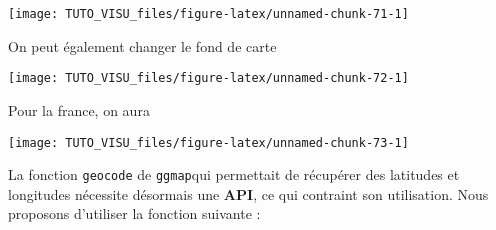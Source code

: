 \documentclass[]{book}
\newenvironment{Shaded}{\begin{snugshade}}{\end{snugshade}}
\newcommand{\DataTypeTok}[1]{\textcolor[rgb]{0.13,0.29,0.53}{#1}}
\newcommand{\DecValTok}[1]{\textcolor[rgb]{0.00,0.00,0.81}{#1}}
\newcommand{\KeywordTok}[1]{\textcolor[rgb]{0.13,0.29,0.53}{\textbf{#1}}}
\newcommand{\NormalTok}[1]{#1}
\newcommand{\OperatorTok}[1]{\textcolor[rgb]{0.81,0.36,0.00}{\textbf{#1}}}
\newcommand{\StringTok}[1]{\textcolor[rgb]{0.31,0.60,0.02}{#1}}
\theoremstyle{definition}
\theoremstyle{definition}
\theoremstyle{definition}
\theoremstyle{remark}
\begin{document}
\begin{center}\texttt{[image: TUTO\_VISU\_files/figure-latex/unnamed-chunk-71-1]} \end{center}

On peut également changer le fond de carte

\begin{Shaded}
\end{Shaded}

\begin{center}\texttt{[image: TUTO\_VISU\_files/figure-latex/unnamed-chunk-72-1]} \end{center}

Pour la france, on aura

\begin{Shaded}
\end{Shaded}

\begin{center}\texttt{[image: TUTO\_VISU\_files/figure-latex/unnamed-chunk-73-1]} \end{center}

La fonction \texttt{geocode} de \texttt{ggmap}qui permettait de récupérer des latitudes et longitudes nécessite désormais une \textbf{API}, ce qui contraint son utilisation. Nous proposons d'utiliser la fonction suivante :
\end{document}
